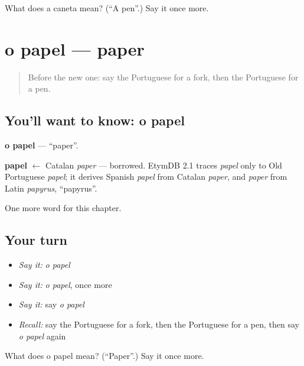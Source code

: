 \begin{tcolorbox}[breakable,colback=teal!4,colframe=teal!35!black,title={Before you move on}]
What does a caneta mean? (\textquotedblleft{}A pen\textquotedblright{}.) Say it once more.
\end{tcolorbox}
\section[o papel]{o papel — paper}

\label{lesson:PT-C52-papel}



\begin{quote}
Before the new one: say the Portuguese for a fork, then the Portuguese for a pen.
\end{quote}

\subsection*{You'll want to know: o papel}
\textbf{o papel} — \textquotedblleft{}paper\textquotedblright{}.

\begin{cousinweb}
\textbf{papel} $\leftarrow$ Catalan \emph{paper} — borrowed. EtymDB 2.1 traces \emph{papel} only to Old Portuguese \emph{papel}; it derives Spanish \emph{papel} from Catalan \emph{paper}, and \emph{paper} from Latin \emph{papyrus}, \textquotedblleft{}papyrus\textquotedblright{}.
\end{cousinweb}

\begin{grammarlens}[title={What you've built}]
One more word for this chapter.
\end{grammarlens}

\subsection*{Your turn}
\begin{itemize}
\raggedright
  \item \emph{Say it:} \emph{o papel}
  \item \emph{Say it:} \emph{o papel}, once more
  \item \emph{Say it:} say \emph{o papel}
  \item \emph{Recall:} say the Portuguese for a fork, then the Portuguese for a pen, then say \emph{o papel} again
\end{itemize}

\begin{tcolorbox}[breakable,colback=teal!4,colframe=teal!35!black,title={Before you move on}]
What does o papel mean? (\textquotedblleft{}Paper\textquotedblright{}.) Say it once more.
\end{tcolorbox}
